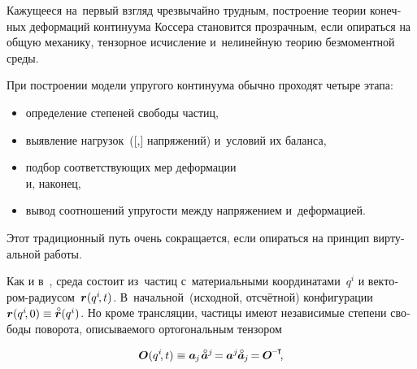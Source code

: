 \begin{otherlanguage}{russian}

Кажущееся на~первый взгляд чрезвычайно трудным, построение теории конечных деформаций континуума Коссера становится прозрачным, если опираться на общую механику, тензорное исчисление и~нелинейную теорию безмоментной среды.

При построении модели упругого континуума обычно проходят четыре этапа:
\begin{itemize}
\item определение степеней свободы частиц,
\item выявление нагрузок~([,] напряжений) и~условий их баланса,
\item подбор соответствующих мер деформации
\\
\hspace*{-\listlabelwithsep}и, наконец,
\item вывод соотношений упругости между напряжением и~деформацией.
\end{itemize}

\vspace{-0.16em} \noindent Этот традиционный путь очень сокращается, если опираться на принцип виртуальной работы.

Как и в~, среда состоит из~частиц с~материальными координатами~$q^i$ и вектором\hbox{-}радиусом~${\bm{r}(q^i\hspace{-0.4ex}, t)}$.
В~начальной~(исходной, отсчётной) конфигурации ${\currentvector(q^i\hspace{-0.4ex}, 0) \equiv \initialvector(q^i)}$.
Но кроме трансляции, частицы имеют независимые степени свободы поворота, описываемого ортогональным тензором

\nopagebreak\vspace{-0.1em}\begin{equation*}
\rotationtensor(q^i\hspace{-0.4ex}, t)
\equiv
\bm{a}_{\hspace{-0.12ex}j} \hspace{.16ex} \mathcircabove{\bm{a}}^j \hspace{-0.32ex}
= \hspace{-0.1ex} \bm{a}^j \hspace{-0.12ex} \mathcircabove{\bm{a}}_{\hspace{-0.12ex}j} \hspace{-0.25ex}
= \hspace{-0.1ex} \rotationtensor^{\hspace{-0.1ex}\expminusT}
\hspace{-0.5ex} ,
\end{equation*}


\end{otherlanguage}
